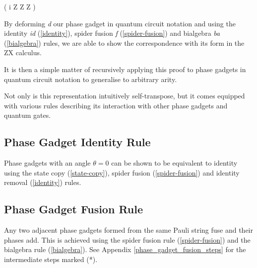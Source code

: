 { \left( i  Z \otimes Z \otimes Z \right)}


By deforming \textit{d} our phase gadget in quantum circuit notation and using the identity \textit{id} (\ref{identity}), spider fusion \textit{f} (\ref{spider-fusion}) and bialgebra \textit{ba} (\ref{bialgebra}) rules, we are able to show the correspondence with its form in the ZX calculus.


It is then a simple matter of recursively applying this proof to phase gadgets in quantum circuit notation to generalise to arbitrary arity.


Not only is this representation intuitively self-transpose, but it comes equipped with various rules describing its interaction with other phase gadgets and quantum gates.


\subsection{Phase Gadget Identity Rule}%
\label{phase-gadget-identity}

Phase gadgets with an angle $\theta = 0$ can be shown to be equivalent to identity using the state copy (\ref{state-copy}), spider fusion (\ref{spider-fusion}) and identity removal (\ref{identity}) rules.



\subsection{Phase Gadget Fusion Rule}%
\label{phase-gadget-fusion}

Any two adjacent phase gadgets formed from the same Pauli string fuse and their phases add. This is achieved using the spider fusion rule (\ref{spider-fusion}) and the bialgebra rule (\ref{bialgebra}). See Appendix  \ref{phase_gadget_fusion_steps} for the intermediate steps marked (*).

